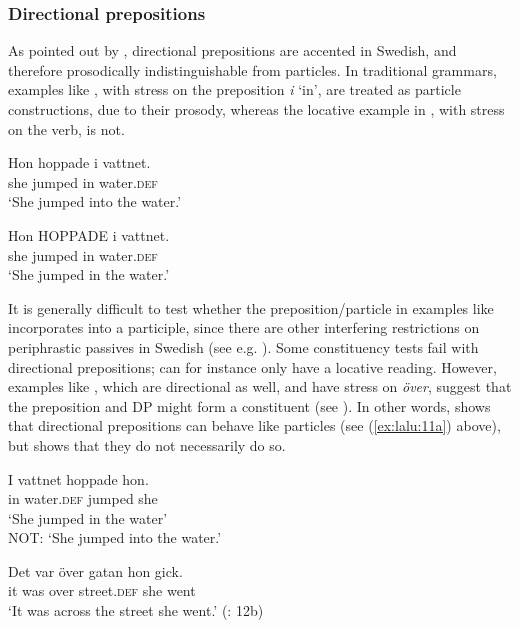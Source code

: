 \documentclass[output=paper]{langscibook}
\begin{document}
\subsubsection{Directional prepositions} 

As pointed out by \citet{Svenonius2003}, directional prepositions are accented in Swedish, and therefore prosodically indistinguishable from particles. In traditional grammars, examples like , with stress on the preposition \textit{i} ‘in’, are treated as particle constructions, due to their prosody, whereas the locative example in , with stress on the verb, is not.


\ea\label{ex:lalu:15}
\ea\label{ex:lalu:15a}
\gll  Hon   hoppade    i   vattnet. \\
    she     jumped     in   water\textsc{.def}\\
\glt `She jumped into the water.'

\ex\label{ex:lalu:15b}
\gll  Hon   HOPPADE   i   vattnet. \\
    she     jumped       in   water\textsc{.def}\\
\glt `She jumped in the water.'
\z
\z


It is generally difficult to test whether the preposition/particle in examples like  incorporates into a participle, since there are other interfering restrictions on periphrastic passives in Swedish (see e.g. \citealt{Engdahl2006}). Some constituency tests fail with directional prepositions;  can for instance only have a locative reading. However, examples like , which are directional as well, and have stress on \textit{över}, suggest that the preposition and DP might form a constituent (see \citealt{Tungseth2006}). In other words,  shows that directional prepositions can behave like particles (see (\ref{ex:lalu:11a}) above), but  shows that they do not necessarily do so.


\ea\label{ex:lalu:16}
\ea\label{ex:lalu:16a}
\gll  I     vattnet   hoppade   hon. \\
    in     water\textsc{.def}  jumped   she\\
\glt `She jumped in the water\textsc{’}\\
    NOT: ‘She jumped into the water.'

\ex\label{ex:lalu:16b}
\gll  Det  var   över   gatan     hon   gick.\\
    it     was  over   street\textsc{.def}   she   went\\
\glt `It was across the street she went.'     (\citealt{Svenonius2003}: 12b)\\
\z
\z
\end{document}
